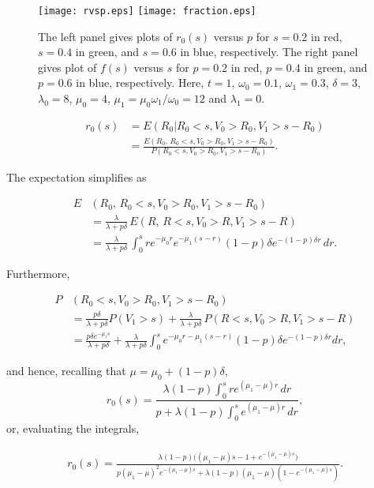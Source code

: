 \documentclass[a4paper,11pt]{article}
\theoremstyle{plain}
\theoremstyle{definition}
\numberwithin{equation}{section}
\begin{document}
\begin{figure*}[!t]
\centerline{
\texttt{[image: rvsp.eps]}
\texttt{[image: fraction.eps]}}
\caption{The left panel gives plots of $r_0(s)$ versus 
$p$ for $s=0.2$ in red, $s=0.4$ in green, and $s=0.6$ 
in blue, respectively. The right panel gives plot of 
$f(s)$ versus $s$ for $p=0.2$ in red, $p=0.4$ in green, 
and $p=0.6$ in blue, respectively. Here, $t=1$, 
$\omega_0=0.1$, $\omega_1=0.3$, $\delta=3$,  
$\lambda_0=8$, $\mu_0=4$, $\mu_1=\mu_0\omega_1/\omega_0=12$  
and $\lambda_1=0$.}
\label{fraction}  
\end{figure*}



\begin{align*} \nonumber
r_0(s)&=E(R_0|R_0<s, V_0>R_0, V_1>s-R_0)\\
  &= \frac{E(R_0,\,R_0<s, V_0>R_0, V_1>s-R_0)}{P(R_0<s, V_0>R_0, V_1>s-R_0)}.
\end{align*}

\noindent The expectation simplifies as

\begin{align*}
E&(R_0,\,R_0<s,V_0>R_0, V_1>s-R_0)\\
  &=\frac{\lambda}{\lambda+p\delta}\, E(R,\,R<s,V_0>R, V_1>s-R)\\
  &=\frac{\lambda}{\lambda+p\delta}\,\int_0^s r e^{-\mu_0 r}e^{-\mu_1(s-r)}(1-p)\delta e^{-(1-p)\delta r}\,dr.
\end{align*}

\noindent Furthermore, 


\begin{align*}
P&(R_0<s, V_0>R_0, V_1>s-R_0)\\
&=\frac{p\delta}{\lambda+p\delta}P(V_1>s)+\frac{\lambda}{\lambda+p\delta}\,P(R<s, V_0>R, V_1>s-R)\\
&=\frac{p\delta e^{-\mu_1 s}}{\lambda+p\delta}+\frac{\lambda}{\lambda+p\delta}\int_0^s e^{-\mu_0 r-\mu_1(s-r)}
(1-p)\delta e^{-(1-p)\delta r}dr,
\end{align*}


\noindent and hence, recalling that $\mu=\mu_0+(1-p)\delta$, 
\[
r_0(s)=\frac{\lambda(1-p) \int_0^s r e^{(\mu_1-\mu)r} \,dr}
     {p + \lambda(1-p) \int_0^s e^{(\mu_1-\mu)r}\,dr},
\]
or, evaluating the integrals, 

\begin{align}
\label{r_0}
r_0(s)=\frac{\lambda(1-p)\Big((\mu_1-\mu)s - 1+ e^{-(\mu_1-\mu)s}\Big)}
     {p(\mu_1-\mu)^2e^{-(\mu_1-\mu)s} + \lambda(1-p)(\mu_1-\mu) (1-e^{-(\mu_1-\mu)s})}.
\end{align}
\end{document}
